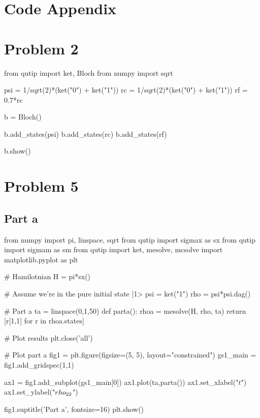 \section*{Code Appendix}
\section*{Problem 2}
\begin{python}
from qutip import ket, Bloch
from numpy import sqrt

psi = 1/sqrt(2)*(ket("0") + ket("1"))
rc = 1/sqrt(2)*(ket("0") + ket("1"))
rf = 0.7*rc

b = Bloch()

b.add_states(psi)
b.add_states(rc)
b.add_states(rf)

b.show()
\end{python}
\section*{Problem 5}
\subsection*{Part a}
\begin{python}
from numpy import pi, linspace, sqrt
from qutip import sigmax as sx
from qutip import sigmam as sm
from qutip import ket, mesolve, mcsolve
import matplotlib.pyplot as plt

# Hamilotnian
H = pi*sx()

# Assume we're in the pure initial state |1>
psi = ket("1")
rho = psi*psi.dag()

# Part a
ta = linspace(0,1,50)
def parta():
    rhoa = mesolve(H, rho, ta)
    return [r[1,1] for r in rhoa.states]

# Plot results
plt.close('all')

# Plot part a
fig1 = plt.figure(figsize=(5, 5), layout="constrained")
gs1_main = fig1.add_gridspec(1,1)

ax1 = fig1.add_subplot(gs1_main[0])
ax1.plot(ta,parta())
ax1.set_xlabel("$t$")
ax1.set_ylabel("$\\rho_{22}$")

fig1.suptitle('Part a', fontsize=16)
plt.show()
\end{python}
